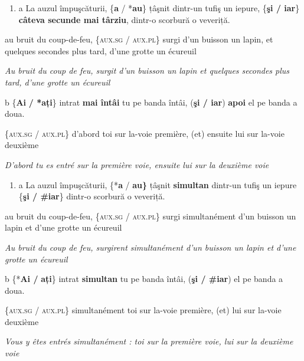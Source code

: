 \begin{enumerate}
\item \label{bkm:Ref290319894}a  La auzul împuşcăturii, \{\textbf{a} / *\textbf{au}\} țâşnit dintr-un tufiş un iepure, \{\textbf{şi / iar}\} \textbf{câteva secunde mai târziu}, dintr-o scorbură o veveriță.


\end{enumerate}
au bruit du coup-de-feu, \{\textsc{aux.sg / aux.pl\}} surgi d'un buisson un lapin, et quelques secondes plus tard, d'une grotte un écureuil

{\itshape
Au bruit du coup de feu, surgit d'un buisson un lapin et quelques secondes plus tard, d'une grotte un écureuil}

  b  \{\textbf{Ai}\textbf{ / *ați}\} intrat \textbf{mai întâi} tu pe banda întâi, (\textbf{şi / iar}) \textbf{apoi} el pe banda a doua.

\{\textsc{aux.sg / aux.pl\}} d'abord toi sur la-voie première, (et) ensuite lui sur la-voie deuxième

{\itshape
D'abord tu es entré sur la première voie, ensuite lui sur la deuxième voie} 


\begin{enumerate}
\item \label{bkm:Ref290319923}a  La auzul împuşcăturii, \{*\textbf{a} / \textbf{au}\textbf{\}} țâşnit \textbf{simultan} dintr-un tufiş un iepure \{\textbf{şi / \#iar}\} dintr-o scorbură o veveriță.


\end{enumerate}
au bruit du coup-de-feu, \{\textsc{aux.sg / aux.pl\}} surgi simultanément d'un buisson un lapin et d'une grotte un écureuil

{\itshape
Au bruit du coup de feu, surgirent simultanément d'un buisson un lapin et d'une grotte un écureuil}

  b  \{*\textbf{Ai /} \textbf{ați}\} intrat \textbf{simultan} tu pe banda întâi, (\textbf{şi / \#iar}) el pe banda a doua.

\{\textsc{aux.sg / aux.pl\}} simultanément toi sur la-voie première, (et) lui sur la-voie deuxième

{\itshape
Vous y êtes entrés simultanément : toi sur la première voie, lui sur la deuxième voie} 

